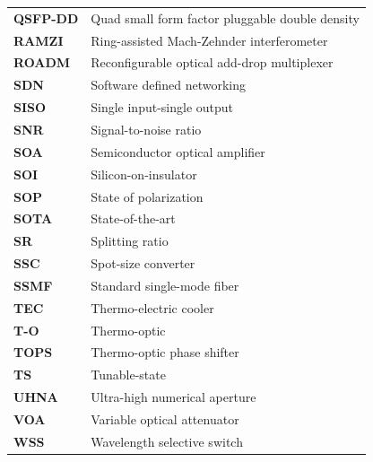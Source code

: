 \begin{longtable}{@{}p{} p{}@{}}
    \textbf{QSFP-DD}  & Quad small form factor pluggable double density \\
    \textbf{RAMZI}  & Ring-assisted Mach-Zehnder interferometer  \\
    \textbf{ROADM}  & Reconfigurable optical add-drop multiplexer  \\
    \textbf{SDN}  & Software defined networking \\
    \textbf{SISO}  & Single input-single output \\
    \textbf{SNR}  & Signal-to-noise ratio \\
    \textbf{SOA}  & Semiconductor optical amplifier \\
    \textbf{SOI}  & Silicon-on-insulator \\
    \textbf{SOP}  & State of polarization \\
    \textbf{SOTA}  & State-of-the-art \\
    \textbf{SR}  & Splitting ratio \\
    \textbf{SSC}  & Spot-size converter \\
    \textbf{SSMF}  & Standard single-mode fiber  \\
    \textbf{TEC}  & Thermo-electric cooler  \\
    \textbf{T-O}  & Thermo-optic \\
    \textbf{TOPS}  & Thermo-optic phase shifter \\
    \textbf{TS}  & Tunable-state \\
    \textbf{UHNA}  & Ultra-high numerical aperture \\
    \textbf{VOA}  & Variable optical attenuator \\
    \textbf{WSS}  & Wavelength selective switch\\
\end{longtable}